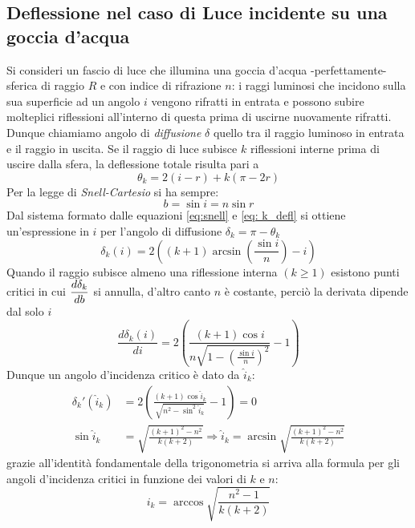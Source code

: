 \documentclass{report}[a4paper,11pt]
\begin{document}
\subsection{Deflessione nel caso di Luce incidente su una goccia d'acqua}
Si consideri un fascio di luce che illumina una goccia d'acqua -perfettamente- sferica di raggio $R$ e con indice di rifrazione $n$: i raggi luminosi che incidono sulla sua superficie ad un angolo $i$ vengono rifratti in entrata e possono subire molteplici riflessioni all'interno di questa prima di uscirne nuovamente rifratti.
Dunque chiamiamo angolo di \emph{diffusione} $\delta$ quello tra il raggio luminoso in entrata e il raggio in uscita. 
Se il raggio di luce subisce $k$ riflessioni interne prima di uscire dalla sfera, la deflessione totale risulta pari a \begin{equation}\label{eq: k_defl}
\theta_k = 2(i-r) + k (\pi - 2r)
\end{equation}
Per la legge di \emph{Snell-Cartesio} si ha sempre:
\begin{equation}\label{eq:snell}
b = \sin{i} = n \sin{r}
\end{equation}
Dal sistema formato dalle equazioni \eqref{eq:snell} e \eqref{eq: k_defl} si ottiene un'espressione in $i$ per l'angolo di diffusione $\delta_k = \pi - \theta_k$
\begin{equation}\label{eq: defl(iota)}
\delta_k(i) = 2\left( (k+1)\arcsin \left(\frac{\sin{i}}{n}\right) -i \right)
\end{equation}
Quando il raggio subisce almeno una riflessione interna $(k\geq 1)$ esistono punti critici in cui $\mathlarger{\frac{d\delta_k}{db}}$ si annulla, d'altro canto $n$ è costante, perciò la derivata dipende dal solo $i$
\begin{equation}
\frac{d \delta_k(i)}{d i} = 2 \left( \frac{(k+1) \cos{i}}{n \sqrt{1 - \left(\frac{\sin{i}}{n}\right)^2}} -1\right)
\end{equation}
Dunque un angolo d'incidenza critico è dato da $\hat{i}_k$:
\begin{align}
\delta_k'(\hat{i}_k) &= 2\left(\frac{(k+1) \cos{\hat{i}_k}}{\sqrt{n^2 - \sin^2{\hat{i}_k}}} - 1 \right) = 0 \\
\sin{\hat{i}_k} &= \sqrt{\frac{(k+1)^2 - n^2}{k(k+2)}} \Rightarrow \hat{i}_k = \arcsin{\sqrt{\frac{(k+1)^2 - n^2}{k(k+2)}}}
\end{align}
grazie all'identità fondamentale della trigonometria si arriva alla formula \cite{Walker} per gli angoli d'incidenza critici in funzione dei valori di $k$ e $n$:
\begin{equation}\label{eq:crit}
i_k = \arccos\sqrt{\frac{n^2-1}{k(k+2)}}
\end{equation}
\end{document}
